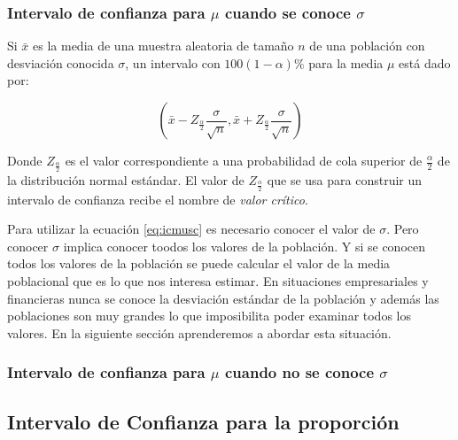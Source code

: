 \documentclass[]{book}
\begin{document}
\subsubsection{\texorpdfstring{Intervalo de confianza para \(\mu\)
cuando se conoce
\(\sigma\)}{Intervalo de confianza para \textbackslash{}mu cuando se conoce \textbackslash{}sigma}}\label{intervalo-de-confianza-para-mu-cuando-se-conoce-sigma}

Si \(\bar{x}\) es la media de una muestra aleatoria de tamaño \(n\) de
una población con desviación conocida \(\sigma\), un intervalo con
\(100\left(1-\alpha\right)\%\) para la media \(\mu\) está dado por:

\begin{equation} 
  \left(\bar{x} - Z_{\frac{\alpha}{2}}\dfrac{\sigma}{\sqrt{n}}, \bar{x} + Z_{\frac{\alpha}{2}}\dfrac{\sigma}{\sqrt{n}}  \right)
  \label{eq:icmusc}
\end{equation}

Donde \(Z_{\frac{\alpha}{2}}\) es el valor correspondiente a una
probabilidad de cola superior de \(\frac{\alpha}{2}\) de la distribución
normal estándar. El valor de \(Z_{\frac{\alpha}{2}}\) que se usa para
construir un intervalo de confianza recibe el nombre de \emph{valor
crítico}.

Para utilizar la ecuación \eqref{eq:icmusc} es necesario conocer el valor
de \(\sigma\). Pero conocer \(\sigma\) implica conocer toodos los
valores de la población. Y si se conocen todos los valores de la
población se puede calcular el valor de la media poblacional que es lo
que nos interesa estimar. En situaciones empresariales y financieras
nunca se conoce la desviación estándar de la población y además las
poblaciones son muy grandes lo que imposibilita poder examinar todos los
valores. En la siguiente sección aprenderemos a abordar esta situación.

\subsubsection{\texorpdfstring{Intervalo de confianza para \(\mu\)
cuando no se conoce
\(\sigma\)}{Intervalo de confianza para \textbackslash{}mu cuando no se conoce \textbackslash{}sigma}}\label{icsd}

\subsection{Intervalo de Confianza para la
proporción}\label{intervalo-de-confianza-para-la-proporcion}
\end{document}
